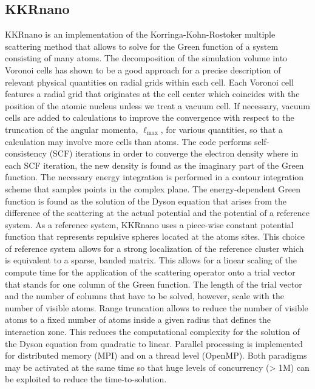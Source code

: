 \documentclass{llncs}
\newcommand{\ellmax}{\ell_{\mathrm{max}}}
\def\KKRnano{{KKRnano}}
\begin{document}
\subsection{KKRnano} \label{section:kkrnano}
\KKRnano{} is an implementation of the Korringa-Kohn-Rostoker multiple scattering method \cite{korringa, kohn-rostoker}
that allows to solve for the Green function of a system consisting of many atoms.
The decomposition of the simulation volume into Voronoi cells has shown to be a good
approach for a precise description of relevant physical quantities on radial grids within each cell.
Each Voronoi cell features a radial grid that originates at the cell center
which coincides with the position of the atomic nucleus unless we treat a vacuum cell.
If necessary, vacuum cells are added to calculations to improve the convergence with respect to the truncation of
the angular momenta, $\ellmax$, for various quantities, so that a calculation may involve more cells than atoms.
The code performs self-consistency (SCF) iterations in order to converge the electron density
where in each SCF iteration, the new density is found as the imaginary part of the Green function.
The necessary energy integration is performed in a contour integration scheme that
samples points in the complex plane.
The energy-dependent Green function is found as the solution of the Dyson equation
that arises from the difference of the scattering at the actual potential and the potential 
of a reference system. As a reference system, \KKRnano{} uses a piece-wise constant potential
function that represents repulsive spheres located at the atoms sites.
This choice of reference system allows for a strong localization of the reference cluster
which is equivalent to a sparse, banded matrix. 
This allows for a linear scaling of the compute time for the application of the scattering operator
onto a trial vector that stands for one column of the Green function. 
The length of the trial vector and the number of columns that have to be solved, however, scale with
the number of visible atoms.
Range truncation allows to reduce the number of visible atoms to a fixed number 
of atoms inside a given radius that defines the interaction zone. This reduces the computational
complexity for the solution of the Dyson equation from quadratic to linear.
Parallel processing is implemented for distributed memory (MPI) and on a thread level (OpenMP).
Both paradigms may be activated at the same time so that huge levels of concurrency 
(> 1M) can be exploited to reduce the time-to-solution.
\end{document}
